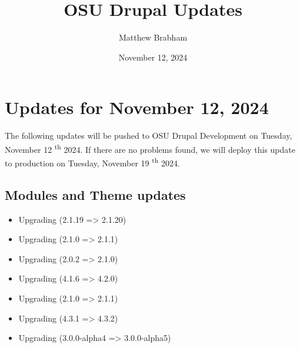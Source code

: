 
\title{OSU Drupal Updates}
\author{Matthew Brabham}
\date{November 12, 2024}

    \maketitle
    \tableofcontents


    \section{Updates for November 12, 2024}
    The following updates will be pushed to OSU Drupal Development on Tuesday, November 12 \textsuperscript{th} 2024.
    If there are no problems found, we will deploy this update to production on Tuesday, November 19 \textsuperscript{th} 2024.

    \subsection{Modules and Theme updates}

    \begin{itemize}
        \item Upgrading  (2.1.19 => 2.1.20)
        \item Upgrading  (2.1.0 => 2.1.1)
        \item Upgrading  (2.0.2 => 2.1.0)
        \item Upgrading  (4.1.6 => 4.2.0)
        \item Upgrading  (2.1.0 => 2.1.1)
        \item Upgrading  (4.3.1 => 4.3.2)
        \item Upgrading  (3.0.0-alpha4 => 3.0.0-alpha5)
    \end{itemize}

